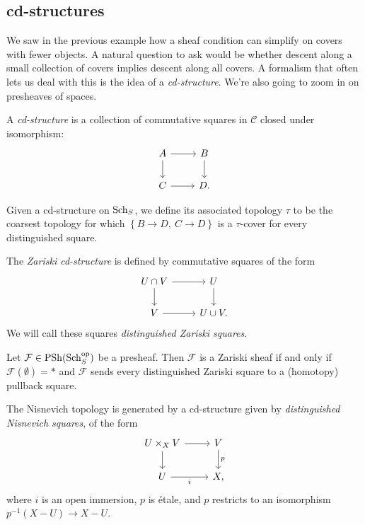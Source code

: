 \documentclass[11pt]{amsart}
\renewcommand{\Pre}{\mathrm{PSh}}
\begin{document}
\subsection{cd-structures} We saw in the previous example how a sheaf condition can simplify on covers with fewer objects. A natural question to ask would be whether descent along a small collection of covers implies descent along all covers. A formalism that often lets us deal with this is the idea of a \textit{cd-structure}. We're also going to zoom in on presheaves of spaces.

\begin{definition} A \textit{cd-structure} is a collection of commutative squares in $\mathscr{C}$ closed under isomorphism:
\[ \begin{tikzcd}
    A\rar\dar & B\dar\\
    C\rar & D.
\end{tikzcd} \]
\end{definition}

\begin{terminology} Given a cd-structure on $\mathrm{Sch}_S$, we define its associated topology $\tau$ to be the coarsest topology for which $\left\{ B\to D,\ C\to D \right\}$ is a $\tau$-cover for every distinguished square.
\end{terminology}



\begin{example} The \textit{Zariski cd-structure} is defined by commutative squares of the form
\[\begin{tikzcd}
    U\cap V\rar\dar & U\dar\\
    V\rar & U\cup V.
\end{tikzcd} \]
We will call these squares \textit{distinguished Zariski squares}.
\end{example}


\begin{theorem} Let $\mathcal{F} \in \Pre(\Sch_S^\op)$ be a presheaf. Then $\mathcal{F}$ is a Zariski sheaf if and only if $\mathcal{F}(\emptyset) = \ast$ and $\mathcal{F}$ sends every distinguished Zariski square to a (homotopy) pullback square.
\end{theorem}






\begin{example} The Nisnevich topology is generated by a cd-structure given by \textit{distinguished Nisnevich squares}, of the form
\[ \begin{tikzcd}
    U \times_X V\rar\dar & V\dar["p" right]\\
    U\rar["i" below] & X,
\end{tikzcd} \]
where $i$ is an open immersion, $p$ is \'etale, and $p$ restricts to an isomorphism $p^{-1}(X-U)\to X-U$.
\end{example}
\end{document}
